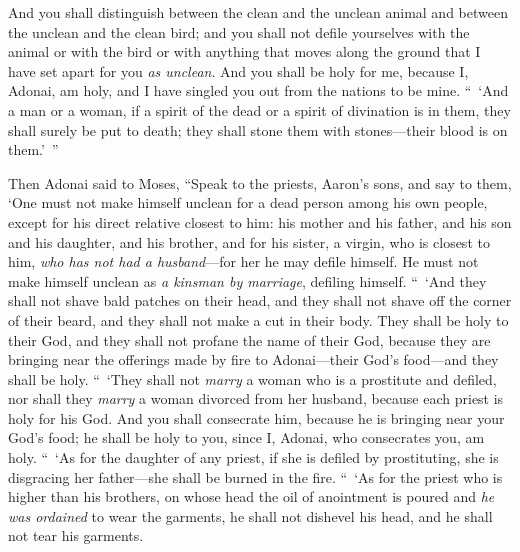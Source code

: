 \begin{biblechapter}
\verse And you shall distinguish between the clean and the unclean animal and between the unclean and the clean bird; and you shall not defile yourselves with the animal or with the bird or with anything that moves along the ground that I have set apart for you \textit{as unclean}.
\verse And you shall be holy for me, because I, Adonai, am holy, and I have singled you out from the nations to be mine.
\verse “ ‘And a man or a woman, if a spirit of the dead or a spirit of divination is in them, they shall surely be put to death; they shall stone them with stones—their blood is on them.’ ”
\end{biblechapter}

\begin{biblechapter} %
 Then Adonai said to Moses, “Speak to the priests, Aaron’s sons, and say to them, ‘One must not make himself unclean for a dead person among his own people,
\verse except for his direct relative closest to him: his mother and his father, and his son and his daughter, and his brother,
\verse and for his sister, a virgin, who is closest to him, \textit{who has not had a husband}—for her he may defile himself.
\verse He must not make himself unclean as \textit{a kinsman by marriage}, defiling himself.
\verse “ ‘And they shall not shave bald patches on their head, and they shall not shave off the corner of their beard, and they shall not make a cut in their body.
\verse They shall be holy to their God, and they shall not profane the name of their God, because they are bringing near the offerings made by fire to Adonai—their God’s food—and they shall be holy.
\verse “ ‘They shall not \textit{marry} a woman who is a prostitute and defiled, nor shall they \textit{marry} a woman divorced from her husband, because each priest is holy for his God.
\verse And you shall consecrate him, because he is bringing near your God’s food; he shall be holy to you, since I, Adonai, who consecrates you, am holy.
\verse “ ‘As for the daughter of any priest, if she is defiled by prostituting, she is disgracing her father—she shall be burned in the fire.
\verse “ ‘As for the priest who is higher than his brothers, on whose head the oil of anointment is poured and \textit{he was ordained} to wear the garments, he shall not dishevel his head, and he shall not tear his garments.

\end{biblechapter}
